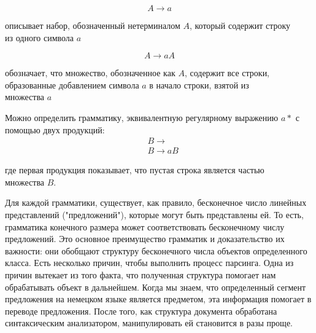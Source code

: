 \begin{equation}
  A \rightarrow a
\end{equation}
\begin{explanation}
описывает набор, обозначенный нетерминалом $A$, который содержит строку \\
из одного символа $a$
\end{explanation}

\begin{equation}
  A \rightarrow aA
\end{equation}
\begin{explanation}
обозначает, что множество, обозначенное как $A$, содержит все строки,\\
образованные добавлением символа $a$ в начало строки, взятой из \\ множества $a$
\end{explanation}
Можно определить  грамматику, эквивалентную регулярному выражению $a*$ с помощью двух продукций:
\begin{equation}
\begin{aligned}
  &B \rightarrow        \\
  &B \rightarrow aB
\end{aligned}
\end{equation}
\begin{explanation}
где первая продукция показывает, что пустая строка является частью \\
множества $B$.
\end{explanation}

Для каждой грамматики, существует, как правило, бесконечное число линейных представлений
("предложений"), которые могут быть представлены ей. То есть, грамматика конечного размера может соответствовать бесконечному числу предложений. Это основное преимущество грамматик
и доказательство их важности: они обобщают структуру бесконечного числа объектов определенного класса.
Есть несколько причин, чтобы выполнить процесс парсинга. Одна из
причин вытекает из того факта, что полученная структура помогает нам обрабатывать объект
в дальнейшем. Когда мы знаем, что определенный сегмент предложения на немецком языке является предметом,
эта информация помогает в переводе предложения. После того, как структура документа обработана синтаксическим анализатором, манипулировать ей становится в разы проще.
